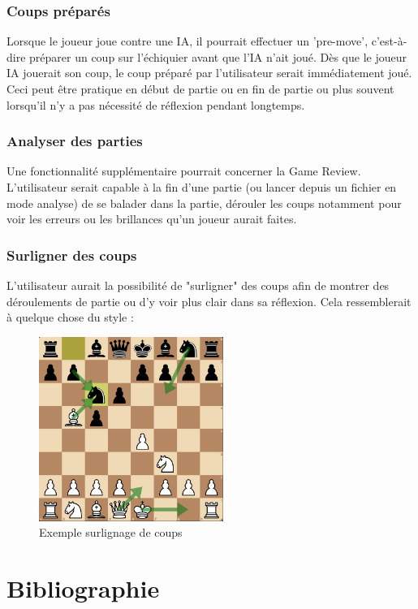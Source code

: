 \documentclass{article}
\begin{document}
\subsubsection{Coups préparés}
Lorsque le joueur joue contre une IA, il pourrait effectuer un 'pre-move', c'est-à-dire préparer un coup sur l'échiquier avant que l'IA n'ait joué. Dès que 
le joueur IA jouerait son coup, le coup préparé par l'utilisateur serait immédiatement joué. Ceci peut être pratique en début de partie ou en fin de partie 
ou plus souvent lorsqu'il n'y a pas nécessité de réflexion pendant longtemps.

\subsubsection{Analyser des parties}
Une fonctionnalité supplémentaire pourrait concerner la Game Review. L'utilisateur serait capable à la fin d'une partie (ou lancer depuis un fichier en mode 
analyse) de se balader dans la partie, dérouler les coups notamment pour voir les erreurs ou les brillances qu'un joueur aurait faites.

\subsubsection{Surligner des coups}
L'utilisateur aurait la possibilité de "surligner" des coups afin de montrer des déroulements de partie ou d'y voir plus clair dans sa réflexion.
Cela ressemblerait à quelque chose du style :\\
\begin{figure}[h]
    \caption{Exemple surlignage de coups}
    \centering
    \includegraphics[width=\textwidth,height=6.0cm,keepaspectratio]{surlignage-coups}
\end{figure}


\section{Bibliographie}
 
 
\end{document}
